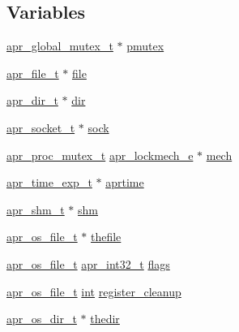 \subsection*{Variables}
\begin{DoxyCompactItemize}
\item 
\hyperlink{structapr__global__mutex__t}{apr\+\_\+global\+\_\+mutex\+\_\+t} $\ast$ \hyperlink{group__apr__portabile_gada0eebef4dcf5c8c753ddb00a872d257}{pmutex}
\item 
\hyperlink{structapr__file__t}{apr\+\_\+file\+\_\+t} $\ast$ \hyperlink{group__apr__portabile_ga4a18bbbd412f9ca4387017cbe38eec30}{file}
\item 
\hyperlink{structapr__dir__t}{apr\+\_\+dir\+\_\+t} $\ast$ \hyperlink{group__apr__portabile_gaf9562e91eff06dd66cd6db440b2c3bbd}{dir}
\item 
\hyperlink{structapr__socket__t}{apr\+\_\+socket\+\_\+t} $\ast$ \hyperlink{group__apr__portabile_ga8292197f1f8dcb54676a30f4d8b95bfb}{sock}
\item 
\hyperlink{structapr__proc__mutex__t}{apr\+\_\+proc\+\_\+mutex\+\_\+t} \hyperlink{group__apr__proc__mutex_ga75dd95a48a1e855a87b509b522746ed4}{apr\+\_\+lockmech\+\_\+e} $\ast$ \hyperlink{group__apr__portabile_ga1e2bd4bf5e9584b52b5fc7d60cc52cb3}{mech}
\item 
\hyperlink{structapr__time__exp__t}{apr\+\_\+time\+\_\+exp\+\_\+t} $\ast$ \hyperlink{group__apr__portabile_gac950216cdeec5e39248681622c546ee4}{aprtime}
\item 
\hyperlink{structapr__shm__t}{apr\+\_\+shm\+\_\+t} $\ast$ \hyperlink{group__apr__portabile_gadb5b80323e350ae97e0793c7ef27cde7}{shm}
\item 
\hyperlink{group__apr__portabile_ga885491b889a4a719549650d3a370fd34}{apr\+\_\+os\+\_\+file\+\_\+t} $\ast$ \hyperlink{group__apr__portabile_ga8dd020a355482f70199dcdcd65464a75}{thefile}
\item 
\hyperlink{group__apr__portabile_ga885491b889a4a719549650d3a370fd34}{apr\+\_\+os\+\_\+file\+\_\+t} \hyperlink{group__apr__platform_ga21ef1e35fd3ff9be386f3cb20164ff02}{apr\+\_\+int32\+\_\+t} \hyperlink{group__apr__portabile_gad55b8bb3342ebfedee9b296136608c5c}{flags}
\item 
\hyperlink{group__apr__portabile_ga885491b889a4a719549650d3a370fd34}{apr\+\_\+os\+\_\+file\+\_\+t} \hyperlink{pcre_8txt_a42dfa4ff673c82d8efe7144098fbc198}{int} \hyperlink{group__apr__portabile_ga96f3c7ceb49cdcb74bdbb6c0702a051f}{register\+\_\+cleanup}
\item 
\hyperlink{group__apr__portabile_gacb790646cfc3da1b43a5f7c4bfaa3937}{apr\+\_\+os\+\_\+dir\+\_\+t} $\ast$ \hyperlink{group__apr__portabile_ga615037f19c897e8cf0feb5f2888fb819}{thedir}

\end{DoxyCompactItemize}

